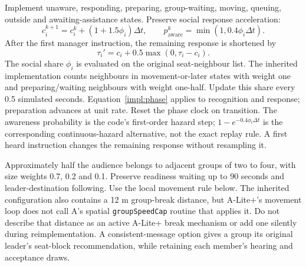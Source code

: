 \documentclass[11pt,a4paper]{article}
\newcommand{\code}[1]{{\small\nolinkurl{#1}}}
\begin{document}
Implement unaware, responding, preparing, group-waiting, moving, queuing, outside and awaiting-assistance states. Preserve social response acceleration:
\begin{equation}
 c_i^{k+1}=c_i^k+(1+1.5\phi_i)\Delta t,\qquad
 p_{\mathrm{aware}}^k=\min(1,0.4\phi_i\Delta t).
\label{impl:phase}
\end{equation}
After the first manager instruction, the remaining response is shortened by
\begin{equation}\label{impl:eq6}
 \tau_i' = c_i+0.5\max(0,\tau_i-c_i).
\end{equation}
The social share $\phi_i$ is evaluated on the original seat-neighbour list. The inherited implementation counts neighbours in movement-or-later states with weight one and preparing/waiting neighbours with weight one-half. Update this share every 0.5 simulated seconds. Equation~\eqref{impl:phase} applies to recognition and response; preparation advances at unit rate. Reset the phase clock on transition. The awareness probability is the code's first-order hazard step; $1-e^{-0.4\phi_i\Delta t}$ is the corresponding continuous-hazard alternative, not the exact replay rule. A first heard instruction changes the remaining response without resampling it.

Approximately half the audience belongs to adjacent groups of two to four, with size weights 0.7, 0.2 and 0.1. Preserve readiness waiting up to 90 seconds and leader-destination following. Use the local movement rule below. The inherited configuration also contains a 12 m group-break distance, but A-Lite+'s movement loop does not call A's spatial \code{groupSpeedCap} routine that applies it. Do not describe that distance as an active A-Lite+ break mechanism or add one silently during reimplementation. A consistent-message option gives a group its original leader's seat-block recommendation, while retaining each member's hearing and acceptance draws.
\end{document}
